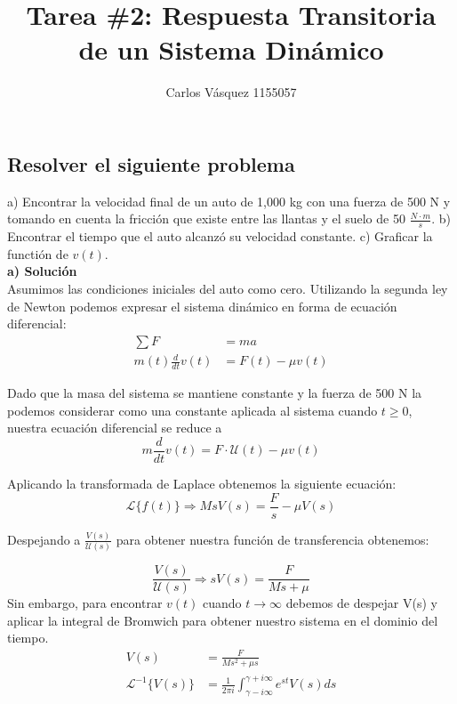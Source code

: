 \documentclass[12pt, letterpaper]{article}
\title{Tarea \#2: Respuesta Transitoria de un Sistema Dinámico}
\author{Carlos Vásquez 1155057}
\begin{document}
\maketitle
\subsection*{Resolver el siguiente problema}
a) Encontrar la velocidad final de un auto de 1,000 kg con una fuerza de 500 N y tomando en cuenta la fricción que existe entre las llantas y el suelo de 50 $\frac{N\cdot m}{s}$. b) Encontrar el tiempo que el auto alcanzó su velocidad constante. c) Graficar la functión de $v(t)$.\\
\textbf{a) Solución}\\
Asumimos las condiciones iniciales del auto como cero. Utilizando la segunda ley de Newton podemos expresar el sistema dinámico en forma de ecuación diferencial:
\begin{equation}
	\begin{split}
		\sum F &= ma\\
		m(t) \frac{d}{dt} v(t) &= F(t) - \mu v(t)
	\end{split}
\end{equation}

Dado que la masa del sistema se mantiene constante y la fuerza de 500 N la podemos considerar como una constante aplicada al sistema cuando $t \geq 0$, nuestra ecuación diferencial se reduce a
\begin{equation}
	m \frac{d}{dt}v(t) = F\cdot \mathscr{U} (t) - \mu v(t)
\end{equation}

Aplicando la transformada de Laplace obtenemos la siguiente ecuación:
\begin{equation}
	\mathscr{L} \{ f(t) \} \Rightarrow  MsV(s) = \frac{F}{s} - \mu V(s)
\end{equation}

Despejando a $\frac{V(s)}{\mathscr{U}(s)}$ para obtener nuestra función de transferencia obtenemos:

\begin{equation}
	\boxed{\frac{V(s)}{\mathscr{U}(s)} \Rightarrow sV(s) = \frac{F}{Ms + \mu}}
\end{equation}
Sin embargo, para encontrar $v(t)$ cuando $t \rightarrow \infty$ debemos de despejar V(s) y aplicar la integral de Bromwich para obtener nuestro sistema en el dominio del tiempo.
\begin{equation}
	\begin{split}
		V(s) &= \frac{F}{Ms^2 + \mu s}\\
		\mathscr{L}^{-1} \{V(s)\} &= \frac{1}{2\pi i} \int_{\gamma - i\infty}^{\gamma + i \infty} e^{st} V(s) ds\\
	\end{split}
\end{equation}
\end{document}
